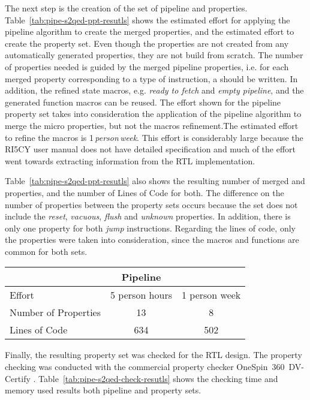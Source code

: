 The next step is the creation of the set of pipeline and \SSQED{} properties. Table~\ref{tab:pipe-s2qed-ppt-resutls} shows the estimated effort for applying the pipeline algorithm to create the merged properties, and the estimated effort to create the \SSQED{} property set. Even though the \SSQED{} properties are not created from any automatically generated properties, they are not build from scratch. The number of properties needed is guided by the merged pipeline properties, i.e. for each merged property corresponding to a type of instruction, a \SSQED{} should be written. In addition, the refined state macros, e.g. \textit{ready to fetch} and \textit{empty pipeline}, and the generated function macros can be reused. The effort shown for the pipeline property set takes into consideration the application of the pipeline algorithm to merge the micro properties, but not the macros refinement.The estimated effort to refine the macros is 1\,\textit{person\,week}. This effort is considerably large because the RI5CY user manual \cite{manual-ri5cy} does not have detailed specification and much of the effort went towards extracting information from the RTL implementation.

Table~\ref{tab:pipe-s2qed-ppt-resutls} also shows the resulting number of merged and \SSQED{} properties, and the number of Lines of Code for both. The difference on the number of properties between the property sets occurs because the \SSQED{} set does not include the \textit{reset}, \textit{vacuous}, \textit{flush} and \textit{unknown} properties. In addition, there is only one \SSQED{} property for both \textit{jump} instructions. Regarding the lines of code, only the properties were taken into consideration, since the macros and functions are common for both sets.

\begin{table*}[htb!] 
	\centering 
	\caption{Results comparison between the Pipeline and \SSQED{} properties sets.} 
	\label{tab:pipe-s2qed-ppt-resutls}
	\begin{tabular}{p{5cm} c c} 
		  &  \textbf{Pipeline} & \textbf{\SSQED{}} \\     
		\hline	
		Effort  &  5 person hours & 1 person week \\
		Number of Properties  &  13 & 8 \\
		Lines of Code  &  634 & 502 \\
	\end{tabular} 
\end{table*}

Finally, the resulting property set was checked for the RTL design. The property checking was conducted with the commercial property checker OneSpin~360~DV-Certify \texttrademark{}. Table~\ref{tab:pipe-s2qed-check-resutls} shows the checking time and memory used results both pipeline and \SSQED{} property sets.

